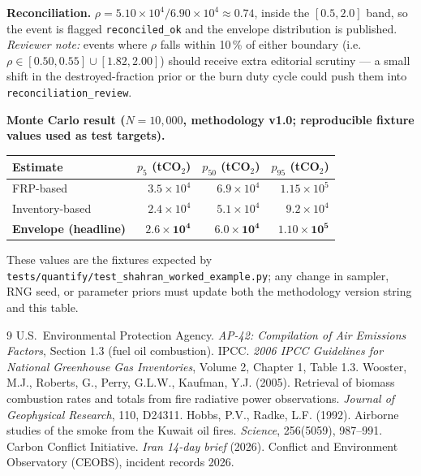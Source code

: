 \documentclass[11pt]{article}
\begin{document}
\textbf{Reconciliation.} $\rho = 5.10 \times 10^{4} / 6.90 \times 10^{4}
\approx 0.74$, inside the $[0.5, 2.0]$ band, so the event is flagged
\texttt{reconciled\_ok} and the envelope distribution is published.
\emph{Reviewer note:} events where $\rho$ falls within 10\,\% of either
boundary (i.e.\ $\rho \in [0.50, 0.55] \cup [1.82, 2.00]$) should receive
extra editorial scrutiny --- a small shift in the destroyed-fraction prior
or the burn duty cycle could push them into \texttt{reconciliation\_review}.

\textbf{Monte Carlo result ($N = 10{,}000$, methodology v1.0; reproducible
fixture values used as test targets).}

\begin{table}[h]
\centering
\begin{tabular}{lrrr}
\toprule
Estimate & $p_5$ (tCO$_2$) & $p_{50}$ (tCO$_2$) & $p_{95}$ (tCO$_2$) \\
\midrule
FRP-based              & $3.5 \times 10^{4}$ & $6.9 \times 10^{4}$ & $1.15 \times 10^{5}$ \\
Inventory-based        & $2.4 \times 10^{4}$ & $5.1 \times 10^{4}$ & $9.2 \times 10^{4}$ \\
\textbf{Envelope (headline)} &
  $\mathbf{2.6 \times 10^{4}}$ & $\mathbf{6.0 \times 10^{4}}$ & $\mathbf{1.10 \times 10^{5}}$ \\
\bottomrule
\end{tabular}
\end{table}

These values are the fixtures expected by
\texttt{tests/quantify/test\_shahran\_worked\_example.py}; any change in
sampler, RNG seed, or parameter priors must update both the methodology
version string and this table.

\begin{thebibliography}{9}
 U.S.\ Environmental Protection Agency. \emph{AP-42:
Compilation of Air Emissions Factors}, Section 1.3 (fuel oil combustion).
 IPCC. \emph{2006 IPCC Guidelines for National
Greenhouse Gas Inventories}, Volume 2, Chapter 1, Table 1.3.
 Wooster, M.J., Roberts, G., Perry, G.L.W., Kaufman,
Y.J. (2005). Retrieval of biomass combustion rates and totals from fire
radiative power observations. \emph{Journal of Geophysical Research},
110, D24311.
 Hobbs, P.V., Radke, L.F. (1992). Airborne studies of
the smoke from the Kuwait oil fires. \emph{Science}, 256(5059), 987--991.
 Carbon Conflict Initiative. \emph{Iran 14-day brief}
(2026).
 Conflict and Environment Observatory (CEOBS), incident
records 2026.
\end{thebibliography}
\end{document}
